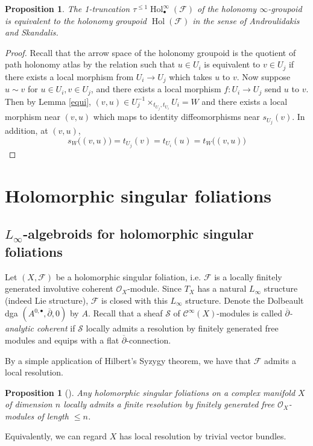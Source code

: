 \documentclass[12pt]{amsart}
\newtheorem{prop}[thm]{Proposition}
\theoremstyle{definition}
\theoremstyle{remark}
\numberwithin{equation}{section}
\newcommand{\delb}{\overline{\partial}}
\newcommand{\CF}{{\mathcal F}}
\newcommand{\CS}{{\mathcal S}}
\newcommand{\CO}{{\mathcal O}}
\newcommand{\cinf}{{\mathcal C}^{\infty}}
\newcommand{\1}{{\mathbb{1}}}
\newcommand{\bt}{\bullet}
\newcommand{\hol}{\operatorname{Hol}}
\newcommand{\li}{L_{\infty}}
\begin{document}
\begin{prop}
    The 1-truncation $\tau^{\le 1} \hol^{\infty}_{\bt}(\CF)$ of the holonomy $\infty$-groupoid is equivalent to the holonomy groupoid $\hol(\CF)$ in the sense of Androulidakis and Skandalis.
\end{prop}

\begin{proof}
    Recall that the arrow space of the holonomy groupoid is the quotient of path holonomy atlas by the relation such that $u\in U_i $ is equivalent to $v\in U_j$ if there exists a local morphism from $U_i\to U_j$ which takes $u$ to $v$. Now suppose $u\sim v$ for $u\in U_i, v\in U_j$, and there exists a local morphism $f: U_i\to U_j$ send $u$ to $v$. Then by Lemma \ref{equi}, $(v,u) \in U_j^{-1}\times_{t_{U_j}, t_{U_i}} U_i=W$ and there exists a local morphism near $(v,u)$ which maps to identity diffeomorphisms near $s_{U_j}(v)$. In addition, at $(v,u)$,
    \begin{equation*}
        s_{W}\big( (v,u)\big) = t_{U_j}(v) = t_{U_i}(u)= t_{W}\big( (v,u)\big)
    \end{equation*}
\end{proof}
\section{Holomorphic singular foliations}
\subsection{$\li$-algebroids for holomorphic singular foliations}
Let $(X, \CF)$ be a holomorphic singular foliation, i.e. $\CF$ is a locally finitely generated involutive coherent $\CO_X$-module. Since $T_{X}$ has a natural $L_{\infty}$ structure (indeed Lie structure), $\CF$ is closed with this $L_{\infty}$ structure. Denote the Dolbeault dga $(A^{0, \bullet}, \delb, 0)$ by $A$. Recall that a sheaf $\CS$ of $\cinf(X)$-modules is called {\it $\delb$-analytic coherent} if $\CS$ locally admits a resolution by finitely generated free modules and equips with a flat $\delb$-connection. 


By a simple application of Hilbert's Syzygy theorem, we have that $\CF$ admits a local resolution.

\begin{prop}[\cite{LLS20}]
	Any holomorphic singular foliations on a complex manifold $X$ of dimension $n$ locally admits a finite resolution by  finitely generated
	free $\CO_X$-modules of length $\le n$. 
\end{prop}
Equivalently, we can regard $X$ has local resolution by trivial vector bundles.
\end{document}
